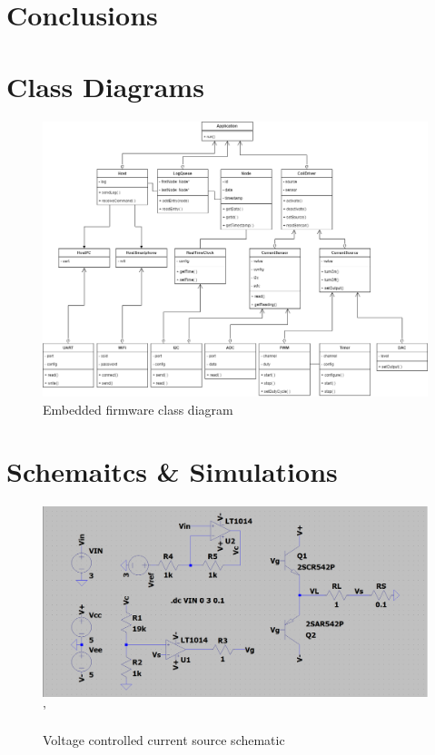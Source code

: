 \documentclass[10pt,twocolumn,letterpaper]{article}
\begin{document}
\section*{Conclusions}

\fi



\onecolumn

\appendix
\appendixpage

\section{Class Diagrams} \label{app:class-diagrams}

\begin{figure}[htb]
  \centering
  \includegraphics[width=\linewidth, keepaspectratio]{figures/emb-class-diagram.png}
  \caption{Embedded firmware class diagram}
  \label{fig:emb-class-diagram}
\end{figure}

\newpage
\section{Schemaitcs \& Simulations} \label{app:schematics}

\begin{figure}[htb]
  \centering
  \includegraphics[width=\linewidth, keepaspectratio]{figures/current-source-schematic.png}'
  \caption{Voltage controlled current source schematic}
  \label{fig:schm-current-source}
\end{figure}
\end{document}
